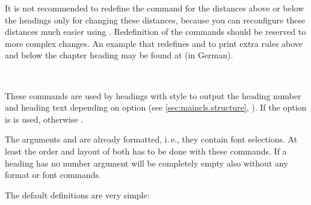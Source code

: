 It is not recommended to redefine the command for the
distances above or below the headings only for changing these distances,
because you can reconfigure these distances much easier using
. Redefinition of the commands should be
reserved to more complex changes. An  example that
redefines  and  to
print extra rules above and below the chapter heading may be found at
\cite{homepage} (in German).%
%
%
%
%
%
%
%
%


\begin{Declaration}
    \\
\end{Declaration}
%
%
These commands are used
by headings with style  to output the heading number and
heading text depending on option
%
 (see \autoref{sec:maincls.structure},
). If the option is
  is used, otherwise
.

The arguments  and  are already formatted, i.\,e.,
they contain font selections. At least the order and layout of both has to be
done with these commands. If a heading has no number argument 
will be completely empty also without any format or font commands.

The default definitions are very simple:
\begin{lstcode}[belowskip=\dp\strutbox plus 1pt]
  \newcommand{\chapterlinesformat}[3]{%
    \@hangfrom{#2}{#3}%
  }
  \newcommand{\chapterlineswithprefixformat}[3]{%
    #2#3%
  }
\end{lstcode}

